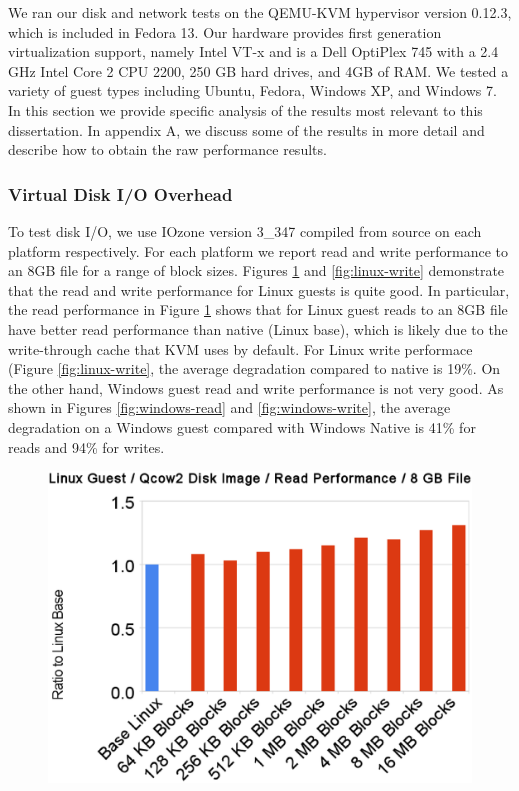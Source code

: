 We ran our disk and network tests on the QEMU-KVM hypervisor version 0.12.3, which is included in Fedora 13. Our hardware provides first generation virtualization support, namely Intel VT-x and is a Dell OptiPlex 745 with a 2.4 GHz Intel Core 2 CPU 2200, 250 GB hard drives, and 4GB of RAM. We tested a variety of guest types including Ubuntu, Fedora, Windows XP, and Windows 7. In this section we provide specific analysis of the results most relevant to this dissertation. In appendix A, we discuss some of the results in more detail and describe how to obtain the raw performance results.

\subsubsection{Virtual Disk I/O Overhead}
To test disk I/O, we use IOzone version 3\_347 compiled from source on each platform respectively. For each platform we report read and write performance to an 8GB file for a range of block sizes. Figures \ref{fig:linux-read} and \ref{fig:linux-write} demonstrate that the read and write performance for Linux guests is quite good. In particular, the read performance in Figure \ref{fig:linux-read} shows that for Linux guest reads to an 8GB file have better read performance than native (Linux base), which is likely due to the write-through cache that KVM uses by default. For Linux write performace (Figure \ref{fig:linux-write}, the average degradation compared to native is 19\%. On the other hand, Windows guest read and write performance is not very good.  As shown in Figures \ref{fig:windows-read} and \ref{fig:windows-write}, the average degradation on a Windows guest compared with Windows Native is 41\% for reads and 94\% for writes.

\begin{figure}[tbp]
\begin{centering}
\label{fig:linux-read}
\includegraphics[scale=.7,angle=90]{figs/linux-read}
\end{centering}
\end{figure}

